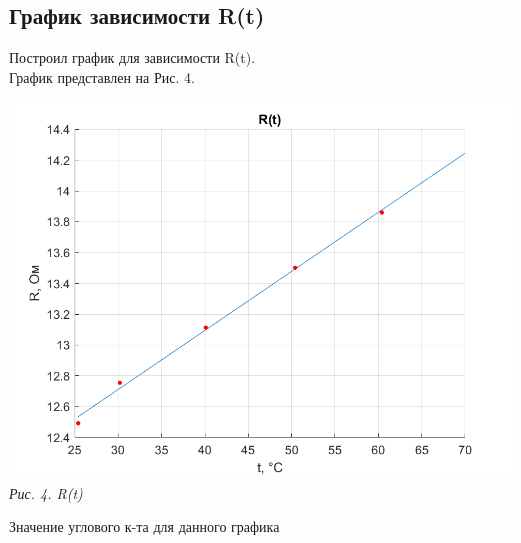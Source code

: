 \newpage

\subsection{График зависимости R(t)}

Построил график для зависимости R(t). \\График представлен на Рис. 4. \\

\begin{center}
    \includegraphics[scale = 1.3]{picks/223_R(T).png} \\
    \textit{\textcolor[HTML]{000000}{Рис. 4. R(t)}}
\end{center} 

\vspace{0.5cm}

Значение углового к-та для данного графика 

\newpage

\subsection{}

